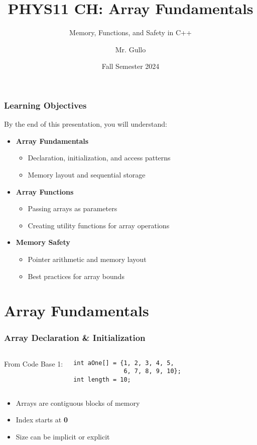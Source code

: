 \documentclass[aspectratio=169]{beamer}
\title[Arrays in C++]{PHYS11 CH: Array Fundamentals}
\subtitle{Memory, Functions, and Safety in C++}
\author[Mr. Gullo]{Mr. Gullo}
\date[Fall 2024]{Fall Semester 2024}
\institute[Physics Dept.]{Department of Physics \\ Advanced Programming Division}
\begin{document}
\begin{frame}
    \titlepage
\end{frame}

\begin{frame}
    \frametitle{Learning Objectives}
    By the end of this presentation, you will understand:
    \begin{itemize}[<+->]
        \item \textbf{Array Fundamentals}
        \begin{itemize}
            \item Declaration, initialization, and access patterns
            \item Memory layout and sequential storage
        \end{itemize}
        \item \textbf{Array Functions}
        \begin{itemize}
            \item Passing arrays as parameters
            \item Creating utility functions for array operations
        \end{itemize}
        \item \textbf{Memory Safety}
        \begin{itemize}
            \item Pointer arithmetic and memory layout
            \item Best practices for array bounds
        \end{itemize}
    \end{itemize}
\end{frame}

\section{Array Fundamentals}

\begin{frame}[fragile]
    \frametitle{Array Declaration \& Initialization}
    \begin{columns}
        From Code Base 1:
        \begin{lstlisting}
int aOne[] = {1, 2, 3, 4, 5, 
              6, 7, 8, 9, 10};
int length = 10;
        \end{lstlisting}
       
    \end{columns}
    \pause
    \begin{itemize}
        \item Arrays are \alert{contiguous} blocks of memory
        \item Index starts at \textbf{0}
        \item Size can be implicit or explicit
    \end{itemize}
\end{frame}
\end{document}
